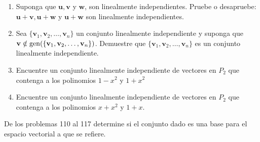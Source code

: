 \begin{enumerate}[start=91]
    \item Suponga que $\mathbf{u}, \mathbf{v}$ y $\mathbf{w}$, son linealmente independientes. Pruebe o desapruebe: $\mathbf{u}+\mathbf{v}, \mathbf{u}+\mathbf{w}$ y $\mathbf{u}+\mathbf{w}$ son linealmente independientes.
    \item Sea $\{\mathbf{v}_{1}, \mathbf{v}_{2}, \dots, \mathbf{v}_{n}\}$ un conjunto linealmente independiente y suponga que $\mathbf{v} \notin \operatorname{gen} ( \{\mathbf{v}_{1}, \mathbf{v}_{2}, \dots, \mathbf{v}_{n}\} )$. Demuestre que $\{\mathbf{v}_{1}, \mathbf{v}_{2}, \dots, \mathbf{v}_{n}\}$ es un conjunto linealmente independiente.
    \item Encuentre un conjunto linealmente independiente de vectores en $P_{2}$ que contenga a los polinomios $1-x^{2}$ y $1+x^{2}$
    \item Encuentre un conjunto linealmente independiente de vectores en $P_{2}$ que contenga a los polinomios $x+x^{2}$ y $1+x$.
\end{enumerate}
De los problemas 110 al 117 determine si el conjunto dado es una base para el espacio vectorial a que se refiere.
